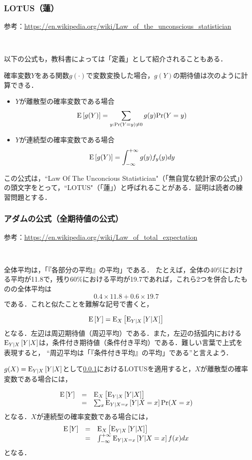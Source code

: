 \documentclass[12pt]{jsarticle}
\begin{document}
\subsubsection{LOTUS（蓮）}\label{sec:lotus}

参考：\url{https://en.wikipedia.org/wiki/Law_of_the_unconscious_statistician}

\


以下の公式も，教科書によっては「定義」として紹介されることもある．

確率変数$Y$をある関数$g(\cdot)$で変数変換した場合，$g(Y)$の期待値は次のように計算できる．

\begin{itemize}
\item $Y$が離散型の確率変数である場合
\[
{\rm E}\left[g(Y)\right]  = \sum_{y: {\rm Pr}(Y=y) \ne 0} g(y){\rm Pr}(Y = y)
\]

\item $Y$が連続型の確率変数である場合
\[
{\rm E}\left[g(Y)\right]  = \int_{-\infty}^{+\infty} g(y)f_y(y) dy
\]
\end{itemize}

この公式は，``Law Of The Unconcious Statistician"（「無自覚な統計家の公式」）の頭文字をとって，``LOTUS"（「蓮」）と呼ばれることがある．証明は読者の練習問題とする．
 


\subsubsection{アダムの公式（全期待値の公式）}\label{sec:adam}
参考：\url{https://en.wikipedia.org/wiki/Law_of_total_expectation}

\

全体平均は，「『各部分の平均』の平均」である．
たとえば，全体の40\%における平均が11.8で，残り60\%における平均が19.7であれば，これら2つを併合したものの全体平均は
\[
0.4 \times 11.8 + 0.6 \times 19.7
\]
である．これと似たことを難解な記号で書くと，

\[
{\rm E}\left[Y\right] = {\rm E}_{X} \left[{\rm E}_{Y|X}\left[Y|X\right]\right]
\]
となる．左辺は周辺期待値（周辺平均）である．また，左辺の括弧内における${\rm E}_{Y|X}\left[Y|X\right]$は，条件付き期待値（条件付き平均）である．難しい言葉で上式を表現すると，
``周辺平均は「『条件付き平均』の平均」である''と言えよう．

$g(X) = {\rm E}_{Y|X}\left[Y|X\right]$として\ref{sec:lotus}におけるLOTUSを適用すると，$X$が離散型の確率変数である場合には，

\[
\begin{array}{lll}
{\rm E}\left[Y\right]  & =  & {\rm E}_{X} \left[{\rm E}_{Y|X}\left[Y|X\right]\right] \\
& = & \sum_{x} {\rm E}_{Y|X=x}\left[Y|X=x\right] {\rm Pr}(X=x)
\end{array}
\]
となる．$X$が連続型の確率変数である場合には，
\[
\begin{array}{lll}
{\rm E}\left[Y\right]  & =  & {\rm E}_{X} \left[{\rm E}_{Y|X}\left[Y|X\right]\right] \\
& = & \int_{-\infty} ^{+\infty}{\rm E}_{Y|X=x}\left[Y|X=x\right]  f(x) dx
\end{array}
\]
となる．
\end{document}
